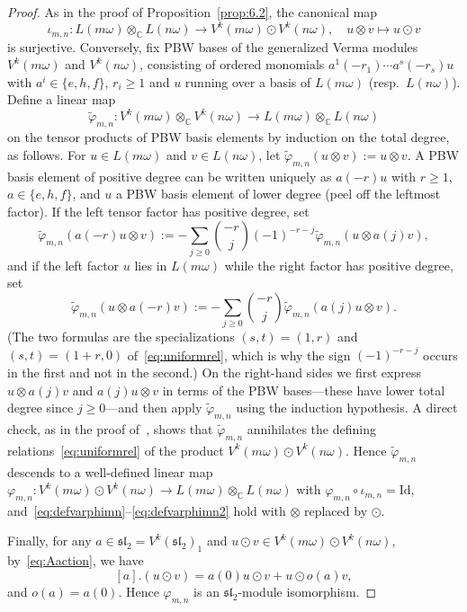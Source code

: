 \documentclass[12pt,a4paper,reqno]{amsart}
\numberwithin{equation}{section}
\theoremstyle{definition}
\renewcommand{\sl}{\mathfrak{sl}}
\newcommand{\C}{\mathbb{C}}
\def\om{\omega}
\def\o{\otimes}
\def\ra{\rightarrow}
\def\Id{\mathrm{Id}}
\begin{document}
\begin{proof}
As in the proof of Proposition~\ref{prop:6.2}, the canonical map
\[
\iota_{m,n}:L(m\om)\o_\C L(n\om)\ra V^k(m\om)\odot V^k(n\om),\quad u\o v\mapsto u\odot v
\]
is surjective. Conversely, fix PBW bases of the generalized Verma modules $V^k(m\om)$ and $V^k(n\om)$, consisting of ordered monomials $a^1(-r_1)\cdots a^s(-r_s)u$ with $a^i\in\{e,h,f\}$, $r_i\geq 1$ and $u$ running over a basis of $L(m\om)$ (resp.\ $L(n\om)$). Define a linear map
\[
\tilde\varphi_{m,n}: V^k(m\om)\o_\C V^k(n\om)\ra L(m\om)\o_\C L(n\om)
\]
on the tensor products of PBW basis elements by induction on the total degree, as follows. For $u\in L(m\om)$ and $v\in L(n\om)$, let $\tilde\varphi_{m,n}(u\o v):=u\o v$. A PBW basis element of positive degree can be written uniquely as $a(-r)u$ with $r\geq 1$, $a\in \{e,h,f\}$, and $u$ a PBW basis element of lower degree (peel off the leftmost factor). If the left tensor factor has positive degree, set
\begin{equation}\label{eq:defvarphimn}
\tilde\varphi_{m,n}(a(-r)u\o v):=-\sum_{j\geq 0}\binom{-r}{j}(-1)^{-r-j} \tilde\varphi_{m,n}(u\o a(j)v),
\end{equation}
and if the left factor $u$ lies in $L(m\om)$ while the right factor has positive degree, set
\begin{equation}\label{eq:defvarphimn2}
\tilde\varphi_{m,n}(u\o a(-r)v):=-\sum_{j\geq 0}\binom{-r}{j} \tilde\varphi_{m,n}(a(j)u\o v).
\end{equation}
(The two formulas are the specializations $(s,t)=(1,r)$ and $(s,t)=(1+r,0)$ of~\eqref{eq:uniformrel}, which is why the sign $(-1)^{-r-j}$ occurs in the first and not in the second.) On the right-hand sides we first express $u\o a(j)v$ and $a(j)u\o v$ in terms of the PBW bases---these have lower total degree since $j\geq 0$---and then apply $\tilde\varphi_{m,n}$ using the induction hypothesis. A direct check, as in the proof of~\cite[Lemma 7.5]{L26}, shows that $\tilde\varphi_{m,n}$ annihilates the defining relations~\eqref{eq:uniformrel} of the product $V^k(m\om)\odot V^k(n\om)$. Hence $\tilde\varphi_{m,n}$ descends to a well-defined linear map $\varphi_{m,n}: V^k(m\om)\odot V^k(n\om)\ra L(m\om)\o_\C L(n\om)$ with $\varphi_{m,n}\circ \iota_{m,n}=\Id$, and~\eqref{eq:defvarphimn}--\eqref{eq:defvarphimn2} hold with $\o$ replaced by $\odot$.

Finally, for any $a\in \sl_2=V^k(\sl_2)_1$ and $u\odot v\in V^k(m\om)\odot V^k(n\om)$, by~\eqref{eq:Aaction}, we have
\[
[a].(u\odot v)=a(0)u\odot v+u\odot o(a)v,
\]
and $o(a)=a(0)$. Hence $\varphi_{m,n}$ is an $\sl_2$-module isomorphism.
\end{proof}
\end{document}
